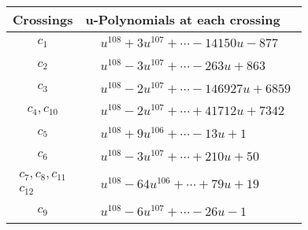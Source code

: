 \documentclass[1p]{elsarticle_modified}
\theoremstyle{definition}
\begin{document}
\begin{tabular}{m{50pt}|m{274pt}}
Crossings & \hspace{64pt}u-Polynomials at each crossing \\
\hline $$\begin{aligned}c_{1}\end{aligned}$$&$\begin{aligned}
&u^{108}+3 u^{107}+\cdots-14150 u-877
\end{aligned}$\\
\hline $$\begin{aligned}c_{2}\end{aligned}$$&$\begin{aligned}
&u^{108}-3 u^{107}+\cdots-263 u+863
\end{aligned}$\\
\hline $$\begin{aligned}c_{3}\end{aligned}$$&$\begin{aligned}
&u^{108}-2 u^{107}+\cdots-146927 u+6859
\end{aligned}$\\
\hline $$\begin{aligned}c_{4},c_{10}\end{aligned}$$&$\begin{aligned}
&u^{108}-2 u^{107}+\cdots+41712 u+7342
\end{aligned}$\\
\hline $$\begin{aligned}c_{5}\end{aligned}$$&$\begin{aligned}
&u^{108}+9 u^{106}+\cdots-13 u+1
\end{aligned}$\\
\hline $$\begin{aligned}c_{6}\end{aligned}$$&$\begin{aligned}
&u^{108}-3 u^{107}+\cdots+210 u+50
\end{aligned}$\\
\hline $$\begin{aligned}c_{7},c_{8},c_{11}\\c_{12}\end{aligned}$$&$\begin{aligned}
&u^{108}-64 u^{106}+\cdots+79 u+19
\end{aligned}$\\
\hline $$\begin{aligned}c_{9}\end{aligned}$$&$\begin{aligned}
&u^{108}-6 u^{107}+\cdots-26 u-1
\end{aligned}$\\
\hline
\end{tabular}\\~\\
\end{document}
